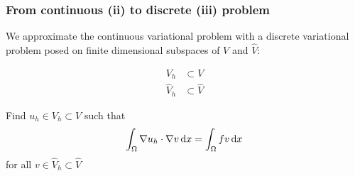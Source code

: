 \begin{frame}
  \frametitle{From continuous (ii) to discrete (iii) problem}

  We approximate the continuous variational problem with a discrete
  variational problem posed on finite dimensional subspaces of $V$ and $\hat{V}$:

  \begin{align*}
    V_h &\subset V \\
    \hat{V}_h &\subset \hat{V}
  \end{align*}

  \bigskip

  Find $u_h \in V_h \subset V$ such that
  \begin{equation*}
    \int_{\Omega} \nabla u_h \cdot \nabla v \, \mathrm{d}x =
    \int_{\Omega} fv \, \mathrm{d}x
  \end{equation*}
  for all $v \in \hat{V}_h \subset \hat{V}$

\end{frame}
